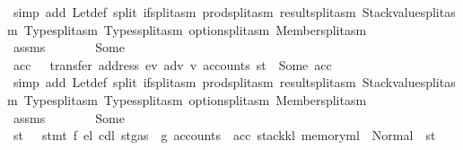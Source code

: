 \begin{isabellebody}
\ {\isacharparenleft}{\kern0pt}simp\ add{\isacharcolon}{\kern0pt}\ Let{\isacharunderscore}{\kern0pt}def\ split{\isacharcolon}{\kern0pt}\ if{\isacharunderscore}{\kern0pt}split{\isacharunderscore}{\kern0pt}asm\ prod{\isachardot}{\kern0pt}split{\isacharunderscore}{\kern0pt}asm\ result{\isachardot}{\kern0pt}split{\isacharunderscore}{\kern0pt}asm\ Stackvalue{\isachardot}{\kern0pt}split{\isacharunderscore}{\kern0pt}asm\ Type{\isachardot}{\kern0pt}split{\isacharunderscore}{\kern0pt}asm\ Types{\isachardot}{\kern0pt}split{\isacharunderscore}{\kern0pt}asm\ option{\isachardot}{\kern0pt}split{\isacharunderscore}{\kern0pt}asm\ Member{\isachardot}{\kern0pt}split{\isacharunderscore}{\kern0pt}asm{\isacharparenright}{\kern0pt}\isanewline
\ \ \ \ \isamarkupfalse%
\ \isamarkupfalse%
\ assms\ {}\ {}\ {}\ {}\ {}\ {}\ {}\ Some\ {}\ \isamarkupfalse%
\ acc\ \ {}{\isacharcolon}{\kern0pt}\ {\isachardoublequoteopen}transfer\ {\isacharparenleft}{\kern0pt}address\ ev{\isacharparenright}{\kern0pt}\ adv\ v{\isacharprime}{\kern0pt}\ {\isacharparenleft}{\kern0pt}accounts\ st{\isacharparenright}{\kern0pt}\ {\isacharequal}{\kern0pt}\ Some\ acc{\isachardoublequoteclose}\ \isamarkupfalse%
\ {\isacharparenleft}{\kern0pt}simp\ add{\isacharcolon}{\kern0pt}\ Let{\isacharunderscore}{\kern0pt}def\ split{\isacharcolon}{\kern0pt}\ if{\isacharunderscore}{\kern0pt}split{\isacharunderscore}{\kern0pt}asm\ prod{\isachardot}{\kern0pt}split{\isacharunderscore}{\kern0pt}asm\ result{\isachardot}{\kern0pt}split{\isacharunderscore}{\kern0pt}asm\ Stackvalue{\isachardot}{\kern0pt}split{\isacharunderscore}{\kern0pt}asm\ Type{\isachardot}{\kern0pt}split{\isacharunderscore}{\kern0pt}asm\ Types{\isachardot}{\kern0pt}split{\isacharunderscore}{\kern0pt}asm\ option{\isachardot}{\kern0pt}split{\isacharunderscore}{\kern0pt}asm\ Member{\isachardot}{\kern0pt}split{\isacharunderscore}{\kern0pt}asm{\isacharparenright}{\kern0pt}\isanewline
\ \ \ \ \isamarkupfalse%
\ \isamarkupfalse%
\ assms\ {}\ {}\ {}\ {}\ {}\ {}\ {}\ Some\ {}\ {}\ \isamarkupfalse%
\ st{\isacharprime}{\kern0pt}{\isacharprime}{\kern0pt}\ \ {}{}{\isacharcolon}{\kern0pt}\ {\isachardoublequoteopen}stmt\ f\ e\isactrlsub l\ cd\isactrlsub l\ {\isacharparenleft}{\kern0pt}st{\isasymlparr}gas\ {\isacharcolon}{\kern0pt}{\isacharequal}{\kern0pt}\ g{\isacharprime}{\kern0pt}{\isacharprime}{\kern0pt}{\isacharcomma}{\kern0pt}\ accounts\ {\isacharcolon}{\kern0pt}{\isacharequal}{\kern0pt}\ acc{\isacharcomma}{\kern0pt}\ stack{\isacharcolon}{\kern0pt}{\isacharequal}{\kern0pt}k\isactrlsub l{\isacharcomma}{\kern0pt}\ memory{\isacharcolon}{\kern0pt}{\isacharequal}{\kern0pt}m\isactrlsub l{\isasymrparr}{\isacharparenright}{\kern0pt}\ {\isacharequal}{\kern0pt}\ Normal\ {\isacharparenleft}{\kern0pt}{\isacharparenleft}{\kern0pt}{\isacharparenright}{\kern0pt}{\isacharcomma}{\kern0pt}\ st{\isacharprime}{\kern0pt}{\isacharprime}{\kern0pt}{\isacharparenright}{\kern0pt}{\isachardoublequoteclose}\ \isamarkupfalse%

\end{isabellebody}
